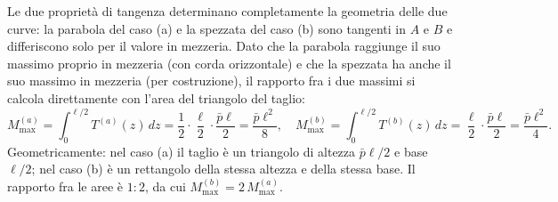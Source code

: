 \begin{esempio}
\begin{svolgimento}
		Le due proprietà di tangenza determinano
		completamente la geometria delle due curve: la
		parabola del caso (a) e la spezzata del caso (b)
		sono tangenti in $A$ e $B$  e differiscono solo
		per il valore in mezzeria. Dato che la parabola
		raggiunge il suo massimo proprio in mezzeria (con corda orizzontale) e che la spezzata ha anche
		il suo massimo in mezzeria (per costruzione), il
		rapporto fra i due massimi si calcola direttamente
		con l'area del triangolo del taglio:
		\[
		M^{(a)}_{\max}
		= \int_0^{\ell/2}\!T^{(a)}(z)\,dz
		= \frac{1}{2}\cdot\frac{\ell}{2}\cdot\frac{\bar p\ell}{2}
		= \frac{\bar p\ell^2}{8},
		\quad
		M^{(b)}_{\max}
		= \int_0^{\ell/2}\!T^{(b)}(z)\,dz
		= \frac{\ell}{2}\cdot\frac{\bar p\ell}{2}
		= \frac{\bar p\ell^2}{4}.
		\]
		Geometricamente: nel caso (a) il taglio è un
		triangolo di altezza $\bar p\ell/2$ e base $\ell/2$;
		nel caso (b) è un rettangolo della stessa altezza
		e della stessa base. Il rapporto fra le aree è
		$1:2$, da cui $M^{(b)}_{\max} = 2\,M^{(a)}_{\max}$.
		
	\end{svolgimento}
\end{esempio}


